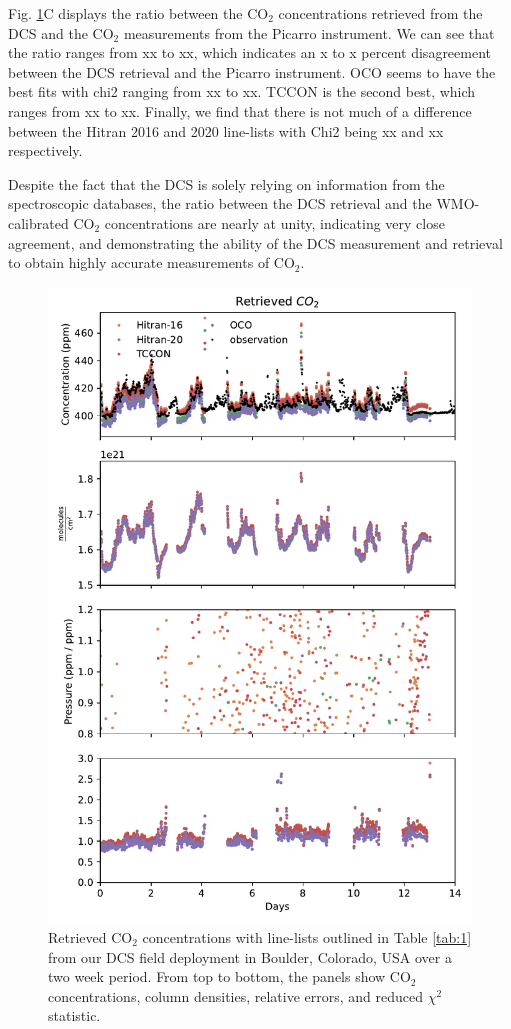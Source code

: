 \documentclass[amt, manuscript]{copernicus}
\begin{document}
Fig. \ref{fig:co2_timeseries}C displays the ratio between the CO$_2$ concentrations retrieved from the DCS and the CO$_2$ measurements from the Picarro instrument. We can see that the ratio ranges from xx to xx, which indicates an x to x percent disagreement between the DCS retrieval and the Picarro instrument. OCO seems to have the best fits with chi2 ranging from xx to xx. TCCON is the second best, which ranges from xx to xx. Finally, we find that there is not much of a difference between the Hitran 2016 and 2020 line-lists with Chi2 being xx and xx respectively.

Despite the fact that the DCS is solely relying on information from the spectroscopic databases, the ratio between the DCS retrieval and the WMO-calibrated CO$_2$ concentrations are nearly at unity, indicating very close agreement, and demonstrating the ability of the DCS measurement and retrieval to obtain highly accurate measurements of CO$_2$.

\begin{figure}
  \centering
  \includegraphics{co2_timeseries.pdf}
  \caption{Retrieved CO$_2$ concentrations with line-lists outlined in Table \ref{tab:1} from our DCS field deployment in Boulder, Colorado, USA over a two week period. From top to bottom, the panels show CO$_2$ concentrations, column densities, relative errors, and reduced $\chi^2$ statistic. }
  \label{fig:co2_timeseries}
\end{figure}
\end{document}
